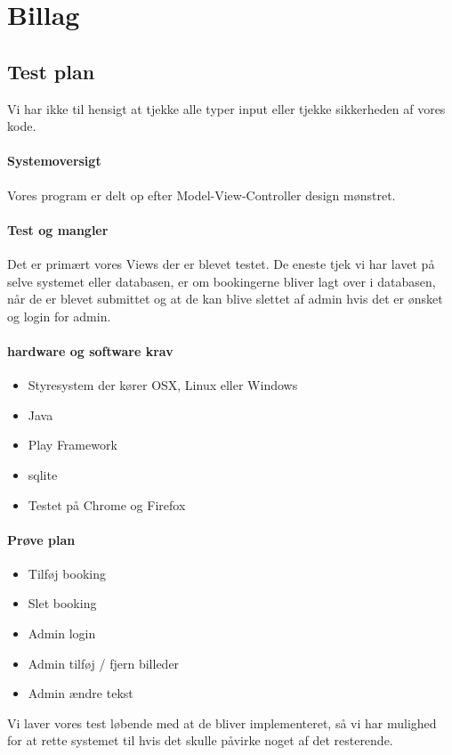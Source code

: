 \documentclass[12pt,a4paper]{article}
\begin{document}
\section{Billag}
\subsection{Test plan}
Vi har ikke til hensigt at tjekke alle typer input eller tjekke sikkerheden af vores kode. 

\paragraph{Systemoversigt}	
Vores program er delt op efter Model-View-Controller design mønstret. 

\paragraph{Test og mangler}
Det er primært vores Views der er blevet testet. De eneste tjek vi har lavet på selve systemet eller databasen, er om bookingerne bliver lagt over i databasen, når de er blevet submittet og at de kan blive slettet af admin hvis det er ønsket og login for admin. 

\paragraph{hardware og software krav}
\begin{itemize}
	\item Styresystem der kører OSX, Linux eller Windows
	\item Java
	\item Play Framework
	\item sqlite
	\item Testet på Chrome og Firefox
\end{itemize}
\paragraph{Prøve plan}
\begin{itemize}
	\item Tilføj booking
	\item Slet booking
	\item Admin login
	\item Admin tilføj / fjern billeder
	\item Admin ændre tekst
\end{itemize}
Vi laver vores test løbende med at de bliver implementeret, så vi har mulighed for at rette systemet til hvis det skulle påvirke noget af det resterende.
\end{document}
